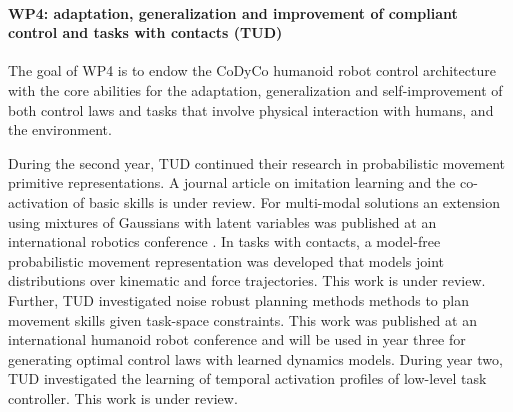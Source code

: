 

\paragraph*{WP4: adaptation, generalization and improvement of compliant control and tasks with contacts (TUD)}

The goal of WP4 is to endow the CoDyCo humanoid robot control architecture with
the core abilities for the adaptation, generalization and self-improvement of
both control laws and tasks that involve physical interaction with humans, and
the environment.

During the second year, TUD continued their research in probabilistic movement
primitive representations. A journal article on imitation learning and the
co-activation of basic skills is under review. For multi-modal solutions an
extension using mixtures of Gaussians with latent variables was published at an
international robotics conference \cite{Rueckert_PICRA_2015}. In tasks with
contacts, a model-free probabilistic movement representation was developed that
models joint distributions over kinematic and force trajectories. This work is
under review. Further, TUD investigated noise robust planning methods methods to
plan movement skills given task-space constraints. This work was published at an
international humanoid robot conference \cite{AICOHumanoidsFinal} and will be
used in year three for generating optimal control laws with learned dynamics
models. During year two, TUD investigated the learning of temporal activation
profiles of low-level task controller. This work is under review. 